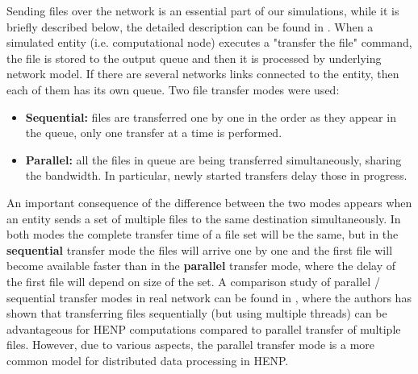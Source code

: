 \documentclass{svjour3}                     %
\begin{document}
Sending files over the network is an essential part of our simulations, while it is briefly described below, the detailed description can be found in \cite{GridSimNetwork}. When a simulated entity (i.e. computational node) executes a "transfer the file" command, the file is stored to the output queue and then it is processed by underlying network model. If there are several networks links connected to the entity, then each of them has its own queue. Two file transfer modes were used:
\begin{itemize}
\item \textbf{Sequential:} files are transferred one by one in the order as they appear in the queue, only one transfer at a time is performed. 
\item \textbf{Parallel:} all the files in queue are being transferred simultaneously, sharing the bandwidth.  In particular, newly started transfers delay those in progress.
\end{itemize}
An important consequence of the difference between the two modes appears when an entity sends a set of multiple files to the same destination simultaneously. In both modes the complete transfer time of a file set will be the same, but in the \textbf{sequential} transfer mode the files will arrive one by one and the first file will become available faster than in the \textbf{parallel} transfer mode, where the delay of the first file will depend on size of the set. A comparison study of parallel / sequential transfer modes in real network can be found in \cite{Zerola}, where the authors has shown that transferring files sequentially (but using multiple threads) can be advantageous for HENP computations compared to parallel transfer of multiple files. However, due to various aspects, the parallel transfer mode is a more common model for distributed data processing in HENP.
\end{document}
